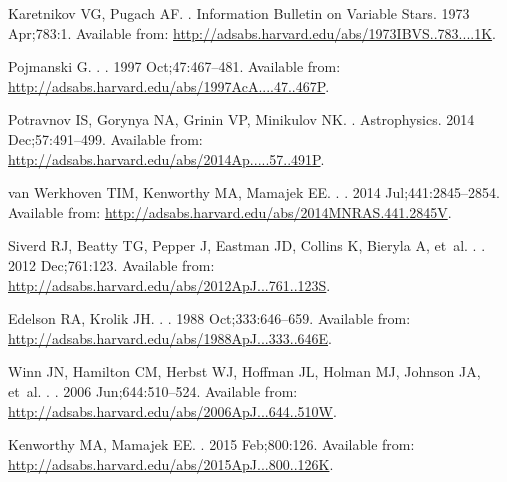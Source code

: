 \documentclass[]{rsos}
\begin{document}
\begin{thebibliography}{10}
{Karetnikov} VG, {Pugach} AF.
.
\newblock Information Bulletin on Variable Stars. 1973 Apr;783:1.
\newblock Available from:
  \url{http://adsabs.harvard.edu/abs/1973IBVS..783....1K}.

{Pojmanski} G.
.
\newblock \actaa. 1997 Oct;47:467--481.
\newblock Available from:
  \url{http://adsabs.harvard.edu/abs/1997AcA....47..467P}.

{Potravnov} IS, {Gorynya} NA, {Grinin} VP, {Minikulov} NK.
.
\newblock Astrophysics. 2014 Dec;57:491--499.
\newblock Available from:
  \url{http://adsabs.harvard.edu/abs/2014Ap.....57..491P}.

{van Werkhoven} TIM, {Kenworthy} MA, {Mamajek} EE.
.
\newblock \mnras. 2014 Jul;441:2845--2854.
\newblock Available from:
  \url{http://adsabs.harvard.edu/abs/2014MNRAS.441.2845V}.

{Siverd} RJ, {Beatty} TG, {Pepper} J, {Eastman} JD, {Collins} K, {Bieryla} A,
  et~al.
.
\newblock \apj. 2012 Dec;761:123.
\newblock Available from:
  \url{http://adsabs.harvard.edu/abs/2012ApJ...761..123S}.

{Edelson} RA, {Krolik} JH.
.
\newblock \apj. 1988 Oct;333:646--659.
\newblock Available from:
  \url{http://adsabs.harvard.edu/abs/1988ApJ...333..646E}.

{Winn} JN, {Hamilton} CM, {Herbst} WJ, {Hoffman} JL, {Holman} MJ, {Johnson} JA,
  et~al.
.
\newblock \apj. 2006 Jun;644:510--524.
\newblock Available from:
  \url{http://adsabs.harvard.edu/abs/2006ApJ...644..510W}.

{Kenworthy} MA, {Mamajek} EE.
\newblock \apj. 2015 Feb;800:126.
\newblock Available from:
  \url{http://adsabs.harvard.edu/abs/2015ApJ...800..126K}.


\end{thebibliography}
\end{document}
